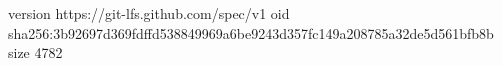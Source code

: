 version https://git-lfs.github.com/spec/v1
oid sha256:3b92697d369fdffd538849969a6be9243d357fc149a208785a32de5d561bfb8b
size 4782
